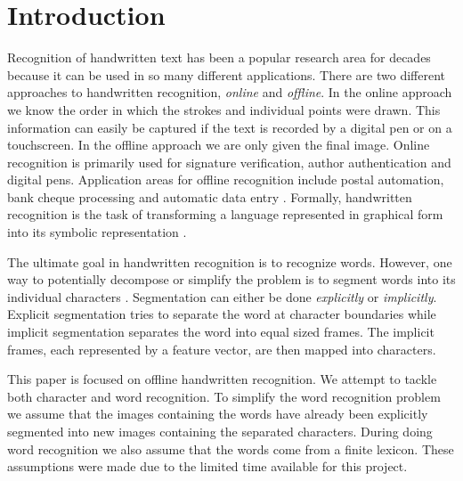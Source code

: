 \section{Introduction}

Recognition of handwritten text has been a popular research area for decades because it can be used in so many different applications.
There are two different approaches to handwritten recognition, \textit{online} and \textit{offline}.
In the online approach we know the order in which the strokes and individual points were drawn.
This information can easily be captured if the text is recorded by a digital pen or on a touchscreen.
In the offline approach we are only given the final image.
Online recognition is primarily used for signature verification, author authentication and digital pens.
Application areas for offline recognition include postal automation, bank cheque processing and automatic data entry \cite{intro1}.
Formally, handwritten recognition is the task of transforming a language represented in graphical form into its symbolic representation \cite{introsurvey}.

The ultimate goal in handwritten recognition is to recognize words.
However, one way to potentially decompose or simplify the problem is to segment words into its individual characters \cite{intro-Yacoubi}. 
Segmentation can either be done \textit{explicitly} or \textit{implicitly}.
Explicit segmentation tries to separate the word at character boundaries while implicit segmentation separates the word into equal sized frames.
The implicit frames, each represented by a feature vector, are then mapped into characters.

This paper is focused on offline handwritten recognition.
We attempt to tackle both character and word recognition.
To simplify the word recognition problem we assume that the images containing the words have already been explicitly segmented into new images containing the separated characters.
During doing word recognition we also assume that the words come from a finite lexicon.
These assumptions were made due to the limited time available for this project.

